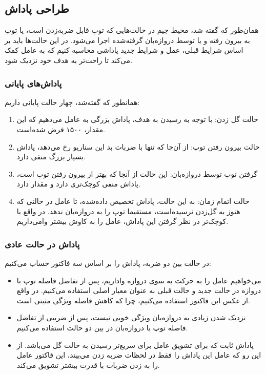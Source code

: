 \subsection{طراحی پاداش}
همان‌طور که گفته شد، محیط جیم در حالت‌هایی که توپ قابل ضربه‌زدن است، یا توپ به بیرون رفته و یا توسط دروازه‌بان گرفته‌شده اجرا می‌شود.
در این حالت‌ها باید بر اساس شرایط قبلی، عمل و شرایط جدید پاداشی محاسبه کنیم که به عامل کمک می‌کند تا راحت‌تر به هدف خود نزدیک شود.
\subsubsection{پاداش‌های پایانی}
همانطور که گفته‌شد، چهار حالت پایانی داریم:
\begin{enumerate}
    \item حالت گل زدن: با توجه به رسیدن به هدف، پاداش بزرگی به عامل می‌دهیم که این مقدار، ۱۵۰۰ فرض شده‌است.
    \item حالت بیرون رفتن توپ: از آن‌جا که تنها با ضربات بد این سناریو رخ می‌دهد، پاداش بسیار بزرگ منفی  دارد.
    \item گرفتن توپ توسط دروازه‌بان: این حالت از آنجا که بهتر از بیرون رفتن توپ است، پاداش منفی کوچک‌تری دارد و مقدار  دارد.
    \item حالت اتمام زمان: به این حالت، پاداش  تخصیص داده‌شده، تا عامل در حالتی که هنوز به گل‌زدن نرسیده‌است، مستقیما توپ را به دروازه‌بان ندهد. در واقع با کوچک‌تر در نظر گرفتن این پاداش، عامل را به کاوش بیشتر وا‌می‌داریم.
\end{enumerate}
\subsubsection{پاداش در حالت عادی}
در حالت بین دو ضربه، پاداش را بر اساس سه فاکتور حساب می‌کنیم:
\begin{itemize}
    \item می‌خواهیم عامل را به حرکت به سوی دروازه واداریم، پس از تفاضل فاصله توپ با دروازه در حالت جدید و حالت قبلی به عنوان معیار اصلی استفاده می‌کنیم. در واقع از عکس این فاکتور استفاده می‌کنیم، چرا که کاهش فاصله ویژگی مثبتی است.
    \item نزدیک شدن زیادی به دروازه‌بان ویژگی خوبی نیست، پس از ضریبی از تفاضل فاصله توپ با دروازه‌بان در بین دو حالت استفاده می‌کنیم.
    \item پاداش ثابت  که برای تشویق عامل برای سریع‌تر رسیدن به حالت گل می‌باشد. از این رو که عامل این پاداش را فقط در لحظات ضربه زدن می‌بیند، این فاکتور عامل را به زدن ضربات با قدرت بیشتر تشویق می‌کند.
\end{itemize}

